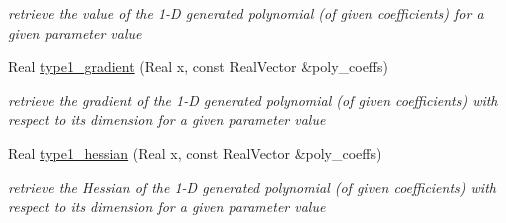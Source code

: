 \begin{DoxyCompactItemize}
\begin{DoxyCompactList}\small\item\em retrieve the value of the 1-\/D generated polynomial (of given coefficients) for a given parameter value \end{DoxyCompactList}\item 
Real \hyperlink{classPecos_1_1NumericGenOrthogPolynomial_a28912cbd5aeeb5fa8f25186709c61393}{type1\+\_\+gradient} (Real x, const Real\+Vector \&poly\+\_\+coeffs)\label{classPecos_1_1NumericGenOrthogPolynomial_a28912cbd5aeeb5fa8f25186709c61393}

\begin{DoxyCompactList}\small\item\em retrieve the gradient of the 1-\/D generated polynomial (of given coefficients) with respect to its dimension for a given parameter value \end{DoxyCompactList}\item 
Real \hyperlink{classPecos_1_1NumericGenOrthogPolynomial_a8c6da1fc223948815cf8430fa34c6f92}{type1\+\_\+hessian} (Real x, const Real\+Vector \&poly\+\_\+coeffs)\label{classPecos_1_1NumericGenOrthogPolynomial_a8c6da1fc223948815cf8430fa34c6f92}

\begin{DoxyCompactList}\small\item\em retrieve the Hessian of the 1-\/D generated polynomial (of given coefficients) with respect to its dimension for a given parameter value \end{DoxyCompactList}\end{DoxyCompactItemize}
